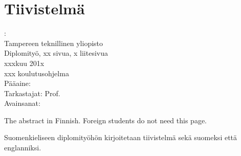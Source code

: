 \documentclass[12pt,a4paper,finnish]{tutthesis}
\begin{document}
\setcounter{page}{0} %





\chapter*{Tiivistelmä}         %

\begin{spacing}{1.0}
         {\bf \textsf{\MakeUppercase{\@author}}}: \@title\\  %
         \textsf{Tampereen teknillinen yliopisto}\\
         \textsf{Diplomityö, xx sivua, x liitesivua}\\ %
         \textsf{xxxkuu 201x}\\
         \textsf{xxx koulutusohjelma}\\
         \textsf{Pääaine: }\\
         \textsf{Tarkastajat:  Prof. \@examiner}\\ %
         \textsf{Avainsanat: }\\
\end{spacing}


The abstract in Finnish. Foreign students do not need this page.

Suomenkieliseen diplomityöhön kirjoitetaan tiivistelmä sekä suomeksi
että englanniksi.
\end{document}
